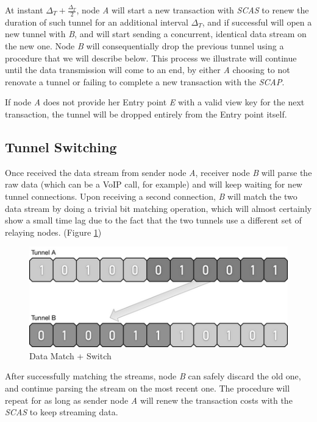 At instant \(\Delta_T + \frac{\Delta_T}{2}\), node \emph{A} will start a
new transaction with \emph{SCAS} to renew the duration of such tunnel
for an additional interval \(\Delta_T\), and if successful will open a
new tunnel with \emph{B}, and will start sending a concurrent, identical
data stream on the new one. Node \emph{B} will consequentially drop the
previous tunnel using a procedure that we will describe below. This
process we illustrate will continue until the data transmission will
come to an end, by either \emph{A} choosing to not renovate a tunnel or
failing to complete a new transaction with the \emph{SCAP}.

If node \emph{A} does not provide her Entry point \emph{E} with a valid
view key for the next transaction, the tunnel will be dropped entirely
from the Entry point itself.

\subsection{Tunnel Switching}

Once received the data stream from sender node \emph{A}, receiver node
\emph{B} will parse the raw data (which can be a VoIP call, for example)
and will keep waiting for new tunnel connections. Upon receiving a
second connection, \emph{B} will match the two data stream by doing a
trivial bit matching operation, which will almost certainly show a small
time lag due to the fact that the two tunnels use a different set of
relaying nodes. (Figure \ref{datamatch})

\begin{figure}
\includegraphics[scale=0.5]{dataswitch}
\caption{Data Match + Switch}
\label{datamatch}
\end{figure}

After successfully matching the streams, node \emph{B} can safely
discard the old one, and continue parsing the stream on the most recent
one. The procedure will repeat for as long as sender node \emph{A} will
renew the transaction costs with the \emph{SCAS} to keep streaming data.


